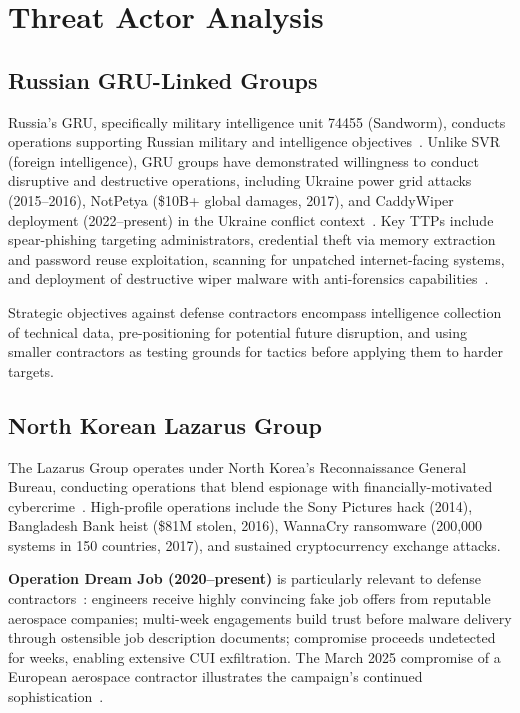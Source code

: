 \documentclass[sigconf,nonacm]{acmart}
\begin{document}
\section{Threat Actor Analysis}

\subsection{Russian GRU-Linked Groups}

Russia's GRU, specifically military intelligence unit 74455 (Sandworm), conducts
operations supporting Russian military and intelligence objectives~\cite{greenberg2021sandworm}.
Unlike SVR (foreign intelligence), GRU groups have demonstrated willingness to conduct
disruptive and destructive operations, including Ukraine power grid attacks (2015--2016),
NotPetya (\$10B+ global damages, 2017), and CaddyWiper deployment (2022--present) in the
Ukraine conflict context~\cite{cisa2024russia,crowdstrike2024global}. Key TTPs include
spear-phishing targeting administrators, credential theft via memory extraction and
password reuse exploitation, scanning for unpatched internet-facing systems, and
deployment of destructive wiper malware with anti-forensics
capabilities~\cite{greenberg2019notpetya}.

Strategic objectives against defense contractors encompass intelligence collection of
technical data, pre-positioning for potential future disruption, and using smaller
contractors as testing grounds for tactics before applying them to harder targets.

\subsection{North Korean Lazarus Group}

The Lazarus Group operates under North Korea's Reconnaissance General Bureau, conducting
operations that blend espionage with financially-motivated
cybercrime~\cite{crowdstrike2024global}. High-profile operations include the Sony
Pictures hack (2014), Bangladesh Bank heist (\$81M stolen, 2016), WannaCry ransomware
(200,000 systems in 150 countries, 2017), and sustained cryptocurrency exchange attacks.

\textbf{Operation Dream Job (2020--present)} is particularly relevant to defense
contractors~\cite{mascellino2025dreamjob}: engineers receive highly convincing fake job
offers from reputable aerospace companies; multi-week engagements build trust before
malware delivery through ostensible job description documents; compromise proceeds
undetected for weeks, enabling extensive CUI exfiltration. The March 2025 compromise of
a European aerospace contractor illustrates the campaign's continued
sophistication~\cite{mascellino2025dreamjob}.
\end{document}
